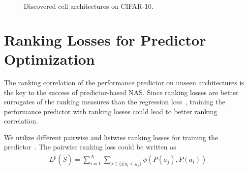 \begin{figure}[th]
  \begin{center}
    \caption{Discovered cell architectures on CIFAR-10.}
    \label{fig:enas_discover_cell}
  \end{center}
  \vspace{-5pt}
\end{figure}

\section{Ranking Losses for Predictor Optimization}

The ranking correlation of the performance predictor on unseen architectures is the key to the success of predictor-based NAS. 
Since ranking losses are better surrogates of the ranking measures than the regression loss~\cite{chen2009}, training the performance predictor with ranking losses could lead to better ranking correlation.

We utilize different pairwise and listwise ranking losses for training the predictor~\cite{burges2005learning,shashua2003ranking,xia2008listwise}. The pairwise ranking loss could be written as
\begin{equation}
    \begin{aligned}
    L^p(\tilde{S})= \sum_{i=1}^{N} \sum_{j \in \{j | y_i < y_j\}} \phi(P(a_j), P(a_i))
    \end{aligned}
\end{equation}


